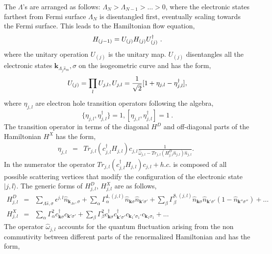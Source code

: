 \documentclass[aps,prl,preprint,groupedaddress]{revtex4-2}
\begin{document}
The $\Lambda$'s are arranged as follows: $\Lambda_{N}>\Lambda_{N-1}>\ldots>0$, where the electronic states farthest from Fermi surface $\Lambda_{N}$ is disentangled first, eventually scaling towards the Fermi surface. This leads to the Hamiltonian flow equation,
\begin{equation}
\centering
H_{(j-1)}=U_{(j)}H_{(j)}U^{\dagger}_{(j)}~.
\end{equation}
where the unitary operation $U_{(j)}$ is the unitary map. $U_{(j)}$ disentangles all the electronic states $\mathbf{k}_{\Lambda_{j}\hat{s}_{m}},\sigma$ on the isogeometric curve and has the form\cite{anirbanmotti},
\begin{equation}
\centering U_{(j)}=\prod_{l}U_{j,l}, U_{j,l}=\frac{1}{\sqrt{2}}[1+\eta_{j,l}-\eta^{\dagger}_{j,l}],
\end{equation}
where $\eta_{j,l}$ are electron hole transition operators following the algebra,
\begin{equation}
\lbrace\eta_{j,l},\eta_{j,l}^{\dagger}\rbrace=1, \left[\eta_{j,l},\eta_{j,l}^{\dagger}\right]=1~.
\end{equation}
The transition operator in terms of the diagonal $H^{D}$ and off-diagonal parts of the Hamiltonian $H^{X}$ has the form,  
\begin{eqnarray}
\eta_{j,l}&=&Tr_{j,l}(c^{\dagger}_{j,l}H_{j,l})c_{j,l}\frac{1}{\hat{\omega}_{j,l}-Tr_{j,l}(H_{j,l}^{D}\hat{n}_{j,l})\hat{n}_{j,l}}.~~\label{e-TransOp}
\end{eqnarray}
In the numerator the operator $Tr_{j,l}(c^{\dagger}_{j,l}H_{j,l})c_{j,l}+h.c.$ is composed of all possible scattering vertices that modify the configuration of the electronic state $|j,l\rangle$. The generic forms of $H^{D}_{j,l}$, $H^{X}_{j,l}$ are as follows,
\begin{eqnarray}
H^{D}_{j,l}&=&\sum_{\Lambda\hat{s},\sigma}\epsilon^{j,l}\hat{n}_{\mathbf{k}_{\Lambda\hat{s}},\sigma}+\sum_{\alpha}\Gamma_{\alpha}^{4,(j,l)}\hat{n}_{\mathbf{k}\sigma}\hat{n}_{\mathbf{k}'\sigma'}+\sum_{\beta}\Gamma_{\beta}^{8,(j,l)}\hat{n}_{\mathbf{k}\sigma}\hat{n}_{\mathbf{k}'\sigma'}(1-\hat{n}_{\mathbf{k}''\sigma''})+\ldots\nonumber\\
H^{X}_{j,l}&=&\sum_{\alpha}\Gamma_{\alpha}^{2}c^{\dagger}_{\mathbf{k}\sigma}c_{\mathbf{k}'\sigma'}+\sum_{\beta}\Gamma_{\beta}^{2}c^{\dagger}_{\mathbf{k}\sigma}c^{\dagger}_{\mathbf{k}'\sigma'}c_{\mathbf{k}_{1}'\sigma_{1}'}c_{\mathbf{k}_{1}\sigma_{1}}+\ldots
\end{eqnarray}
The operator $\hat{\omega}_{j,l}$ accounts for the quantum fluctuation arising from the non commutivity between different parts of the renormalized Hamiltonian and has the form,\cite{anirbanurg1}
\end{document}
